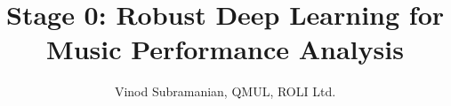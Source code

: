\documentclass[journal,onecolumn]{IEEEtran}
\begin{document}
%
\title{Stage 0: Robust Deep Learning for Music Performance Analysis}
%
%
%

\author{Vinod Subramanian, QMUL, ROLI Ltd.}%


% 
%




% 
\end{document}
